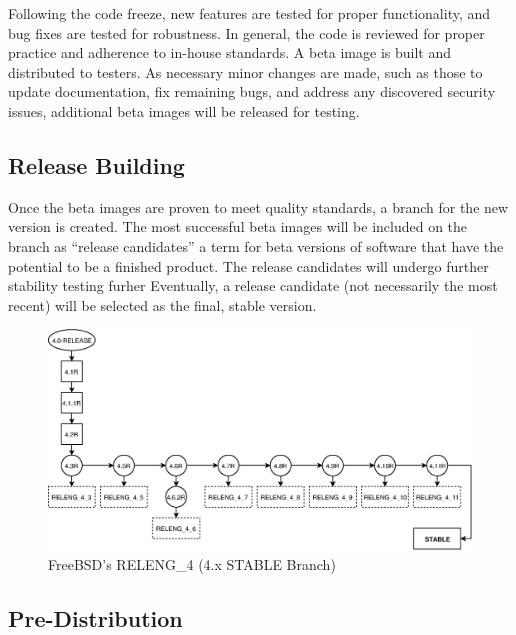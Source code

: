 \documentclass[conference]{IEEEtran}
\begin{document}
Following the code freeze, new features are tested for proper functionality,
and bug fixes are tested for robustness. In general, the code
is reviewed for proper practice and adherence to in-house standards.
A beta image is built and distributed to testers.
As necessary minor changes are made, such as those to update documentation,
fix remaining bugs, and address any discovered security issues,
additional beta images will be released for testing.

\subsection{Release Building}

Once the beta images are proven to meet quality standards,
a branch for the new version is created.
The most successful beta images will be included on the branch
as ``release candidates'' a term for beta versions of software
that have the potential to be a finished product.
The release candidates will undergo further stability testing furher
Eventually, a release candidate (not necessarily the most recent) will
be selected as the final, stable version.

\begin{figure}[h!]
\includegraphics[width=\linewidth]{./images/FreeBSD_4.eps}
\caption{FreeBSD's RELENG\_4 (4.x STABLE Branch)}
\label{FreeBSD_4}
\end{figure}

\subsection{Pre-Distribution}
\end{document}
